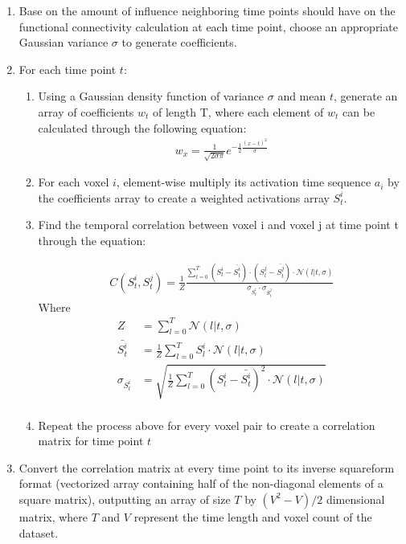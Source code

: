 \documentclass[11pt]{article}
\begin{document}
\begin{enumerate}
\item Base on the amount of influence neighboring time points should have on the functional connectivity calculation at each time point, choose an appropriate Gaussian variance $\sigma$ to generate coefficients.

\item For each time point $t$:
\begin{enumerate}
\item Using a Gaussian density function of variance $\sigma$ and mean $t$, generate an array of coefficients $w_t$ of length T, where each element of $w_t$ can be calculated through the following equation:
\begin{align*}
w_x = \frac{1}{\sqrt{2\sigma\pi}}e^{-\frac12 \frac{(x-t)^2}{\sigma}}
\end{align*}

\item For each voxel $i$, element-wise multiply its activation time sequence $a_i$ by the coefficients array to create a weighted activations array $S^i_t$.

\item Find the temporal correlation between voxel i and voxel j at time point t through the equation:

\begin{align*}
C(S^i_t,S^j_t) = \frac{1}{Z}\frac{\sum_{l=0}^T (S_l^i - \bar{S^i_t})\cdot(S^j_l - \bar{S^j_t})\cdot \mathcal{N}(l|t,\sigma)}{\sigma_{S_t^i} \cdot \sigma_{S_t^j}}
\end{align*}
Where
\begin{align*}
Z &= \sum_{l=0}^T \mathcal{N}(l|t,\sigma)\\
\bar{S^i_t} &=\frac{1}{Z} \sum_{l=0}^T S^i_l \cdot \mathcal{N}(l|t,\sigma)\\
\sigma_{S_t^i} &=\sqrt{ \frac{1}{Z}\sum_{l=0}^T (S_l^i-\bar{S_t^i})^2 \cdot \mathcal{N}(l|t,\sigma)}\\
\end{align*}
\item Repeat the process above for every voxel pair to create a correlation matrix for time point $t$
\end{enumerate}
\item Convert the correlation matrix at every time point to its inverse squareform format (vectorized array containing half of the non-diagonal elements of a square matrix), outputting an array of size $T$ by $(V^2-V)/2$ dimensional matrix, where $T$ and $V$ represent the time length and voxel count of the dataset.
\end{enumerate}
\end{document}
